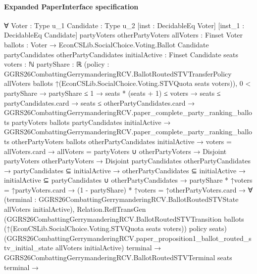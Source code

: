 \documentclass[10pt]{article}
\begin{document}
\paragraph{Expanded PaperInterface specification}
\begin{ReviewVerbatim}
∀ {Voter : Type u_1} {Candidate : Type u_2} [inst : DecidableEq Voter] [inst_1 : DecidableEq Candidate]
  {partyVoters otherPartyVoters allVoters : Finset Voter}
  {ballots : Voter → EconCSLib.SocialChoice.Voting.Ballot Candidate}
  {partyCandidates otherPartyCandidates initialActive : Finset Candidate} {seats voters : ℕ} {partyShare : ℝ}
  (policy :
    GGRS26CombattingGerrymanderingRCV.BallotRoutedSTVTransferPolicy allVoters ballots
      ↑(EconCSLib.SocialChoice.Voting.STVQuota seats voters)),
  0 < partyShare →
    partyShare ≤ 1 →
      seats * (seats + 1) ≤ voters →
        seats ≤ partyCandidates.card →
          seats ≤ otherPartyCandidates.card →
            GGRS26CombattingGerrymanderingRCV.paper_complete_party_ranking_ballots partyVoters ballots partyCandidates
                initialActive →
              GGRS26CombattingGerrymanderingRCV.paper_complete_party_ranking_ballots otherPartyVoters ballots
                  otherPartyCandidates initialActive →
                voters = allVoters.card →
                  allVoters = partyVoters ∪ otherPartyVoters →
                    Disjoint partyVoters otherPartyVoters →
                      Disjoint partyCandidates otherPartyCandidates →
                        partyCandidates ⊆ initialActive →
                          otherPartyCandidates ⊆ initialActive →
                            initialActive ⊆ partyCandidates ∪ otherPartyCandidates →
                              partyShare * ↑voters = ↑partyVoters.card →
                                (1 - partyShare) * ↑voters = ↑otherPartyVoters.card →
                                  ∀
                                    (terminal :
                                      GGRS26CombattingGerrymanderingRCV.BallotRoutedSTVState allVoters initialActive),
                                    Relation.ReflTransGen
                                        (GGRS26CombattingGerrymanderingRCV.BallotRoutedSTVTransition ballots
                                          (↑(EconCSLib.SocialChoice.Voting.STVQuota seats voters)) policy seats)
                                        (GGRS26CombattingGerrymanderingRCV.paper_proposition1_ballot_routed_stv_initial_state
                                          allVoters initialActive)
                                        terminal →
                                      GGRS26CombattingGerrymanderingRCV.BallotRoutedSTVTerminal seats terminal →

\end{ReviewVerbatim}
\end{document}
